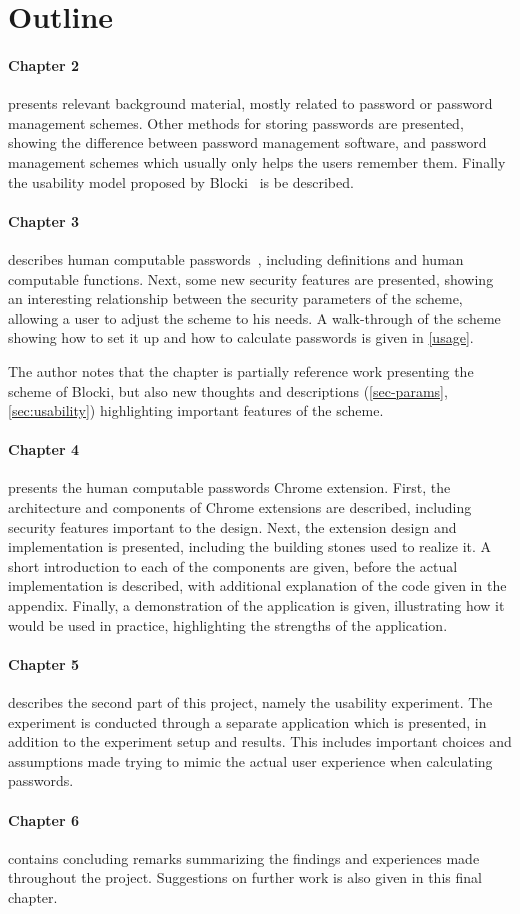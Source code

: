 \section{Outline}
\paragraph{Chapter 2} presents relevant background material, mostly related to password or password management schemes. Other methods for storing passwords are presented, showing the difference between password management software, and password management schemes which usually only helps the users remember them. Finally the usability model proposed by Blocki~\cite{Blocki2014} is be described.
\paragraph{Chapter 3} describes human computable passwords~\cite{hcp-blocki}, including definitions and human computable functions. Next, some new security features are presented, showing an interesting relationship between the security parameters of the scheme, allowing a user to adjust the scheme to his needs. A walk-through of the scheme showing how to set it up and how to calculate passwords is given in \autoref{usage}.
\par The author notes that the chapter is partially reference work presenting the scheme of Blocki, but also new thoughts and descriptions (\autoref{sec-params}, \autoref{sec:usability}) highlighting important features of the scheme. 
\paragraph{Chapter 4} presents the human computable passwords Chrome extension. First, the architecture and components of Chrome extensions are described, including security features important to the design. Next, the extension design and implementation is presented, including the building stones used to realize it. A short introduction to each of the components are given, before the actual implementation is described, with additional explanation of the code given in the appendix. Finally, a demonstration of the application is given, illustrating how it would be used in practice, highlighting the strengths of the application.
\paragraph{Chapter 5} describes the second part of this project, namely the usability experiment. The experiment is conducted through a separate application which is presented, in addition to the experiment setup and results. This includes important choices and assumptions made trying to mimic the actual user experience when calculating passwords.
\paragraph{Chapter 6} contains concluding remarks summarizing the findings and experiences made throughout the project. Suggestions on further work is also given in this final chapter.


